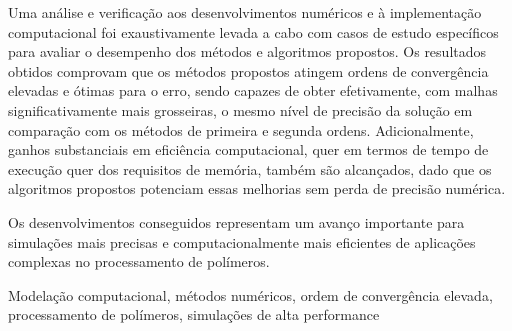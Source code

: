 Uma an\'alise e verifica\c c\~ao aos desenvolvimentos num\'ericos e \`a implementa\c c\~ao computacional foi exaustivamente levada a cabo com casos de estudo espec\'ificos para avaliar o desempenho dos m\'etodos e algoritmos propostos.
Os resultados obtidos comprovam que os m\'etodos propostos atingem ordens de converg\^encia elevadas e \'otimas para o erro, sendo capazes de obter efetivamente, com malhas significativamente mais grosseiras, o mesmo n\'ivel de precis\~ao da solu\c c\~ao em compara\c c\~ao com os m\'etodos de primeira e segunda ordens.
Adicionalmente, ganhos substanciais em efici\^encia computacional, quer em termos de tempo de execu\c c\~ao quer dos requisitos de mem\'oria, tamb\'em s\~ao alcan\c cados, dado que os algoritmos propostos potenciam essas melhorias sem perda de precis\~ao num\'erica.

Os desenvolvimentos conseguidos representam um avan\c co importante para simula\c c\~oes mais precisas e computacionalmente mais eficientes de aplica\c c\~oes complexas no processamento de pol\'imeros.

\vspace{0.5cm}

\begin{resumopalavraschave}
Modela\c c\~ao computacional, m\'etodos num\'ericos, ordem de converg\^encia elevada, processamento de pol\'imeros, simula\c c\~oes de alta performance
\end{resumopalavraschave}

